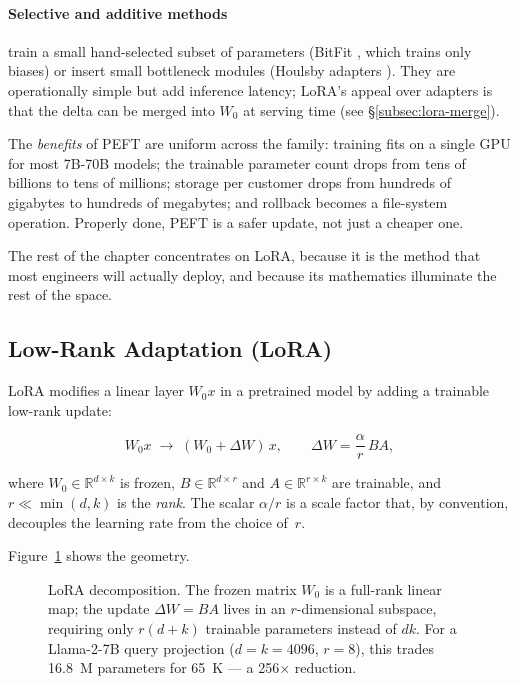 \paragraph{Selective and additive methods} train a small
hand-selected subset of parameters (BitFit
\citep{zaken2022bitfit}, which trains only biases) or insert small
bottleneck modules (Houlsby adapters \citep{houlsby2019adapters}).
They are operationally simple but add inference latency; LoRA's
appeal over adapters is that the delta can be merged into $W_0$ at
serving time (see \S\ref{subsec:lora-merge}).

The \emph{benefits} of PEFT are uniform across the family:
training fits on a single GPU for most 7B-70B models;
the trainable parameter count drops from tens of billions to tens of
millions; storage per customer drops from hundreds of gigabytes to
hundreds of megabytes; and rollback becomes a file-system operation.
Properly done, PEFT is a safer update, not just a cheaper one.

The rest of the chapter concentrates on LoRA, because it is the
method that most engineers will actually deploy, and because its
mathematics illuminate the rest of the space.

\subsection{Low-Rank Adaptation (LoRA)}

LoRA \citep{hu2021lora} modifies a linear layer $W_0 x$ in a
pretrained model by adding a trainable low-rank update:

\begin{equation}
  W_0 x \;\longrightarrow\; (W_0 + \Delta W)\,x,
  \qquad
  \Delta W = \frac{\alpha}{r}\, B A,
  \label{eq:lora-core}
\end{equation}

where $W_0 \in \mathbb{R}^{d\times k}$ is frozen,
$B \in \mathbb{R}^{d\times r}$ and $A \in \mathbb{R}^{r\times k}$ are
trainable, and $r \ll \min(d,k)$ is the \emph{rank}. The scalar
$\alpha/r$ is a scale factor that, by convention, decouples the learning
rate from the choice of~$r$.

Figure~\ref{fig:lora-decomp} shows the geometry.

\begin{figure}[ht]
  \centering
  
  \caption{LoRA decomposition. The frozen matrix $W_0$ is a full-rank
  linear map; the update $\Delta W = BA$ lives in an $r$-dimensional
  subspace, requiring only $r(d+k)$ trainable parameters instead of
  $dk$. For a Llama-2-7B query projection ($d=k=4096$, $r=8$), this
  trades 16.8~M parameters for 65~K --- a 256$\times$ reduction.}
  \label{fig:lora-decomp}
\end{figure}

